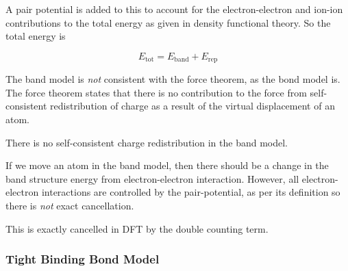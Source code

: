 \documentclass[11pt]{article}
\begin{document}
A pair potential is added to this to account for the electron-electron and ion-ion contributions to the total energy 
as given in density functional theory.
So the total energy is 

$$ E_{\text{tot}} =   E_{\text{band}} + E_{\text{rep}} $$


The band model is \emph{not} consistent with the force theorem, as the bond model is.
The force theorem states that there is no contribution to the force from self-consistent redistribution of charge 
as a result of the virtual displacement of an atom. 

There is no self-consistent charge redistribution in the band model.

If we move an atom in the band model, then there should be a change in the band structure energy from electron-electron interaction. 
However, all electron-electron interactions are controlled by the pair-potential, as per its definition so there is \emph{not} exact 
cancellation. 

This is exactly cancelled in DFT by the double counting term. 


\subsubsection{Tight Binding Bond Model}
\label{sec-1-1-2}
\end{document}
